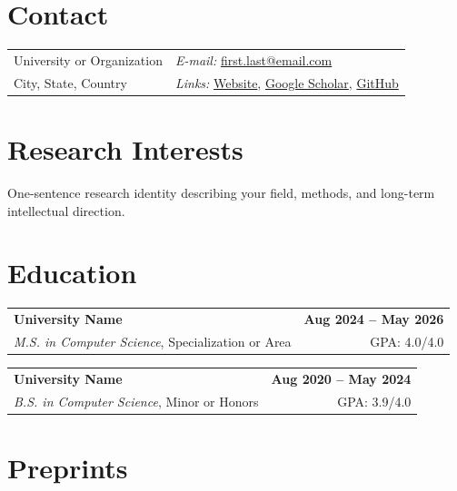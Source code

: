 \documentclass[margin,line]{res}
\begin{document}

\begin{resume}

\section{\sc Contact}
\vspace{.05in}
\begin{tabularx}{\textwidth}{@{}X l@{}}
University or Organization & {\it E-mail:} \href{mailto:first.last@email.com}{\textcolor{cvblue}{first.last@email.com}} \\
City, State, Country & {\it Links:} \href{https://yourwebsite.com}{\textcolor{cvblue}{Website}}, \href{https://scholar.google.com/}{\textcolor{cvblue}{Google Scholar}}, \href{https://github.com/username}{\textcolor{cvblue}{GitHub}} \\
\end{tabularx}

\section{\sc Research Interests}
One-sentence research identity describing your field, methods, and long-term intellectual direction.

\section{\sc Education}

\begin{tabularx}{\textwidth}{@{}X r@{}}
\textbf{University Name} & \textbf{Aug 2024 -- May 2026} \\
\emph{M.S. in Computer Science}, Specialization or Area & GPA: 4.0/4.0 \\
\end{tabularx}

\begin{tabularx}{\textwidth}{@{}X r@{}}
\textbf{University Name} & \textbf{Aug 2020 -- May 2024} \\
\emph{B.S. in Computer Science}, Minor or Honors & GPA: 3.9/4.0 \\
\end{tabularx}

\section{\sc Preprints}


\end{resume}
\end{document}
